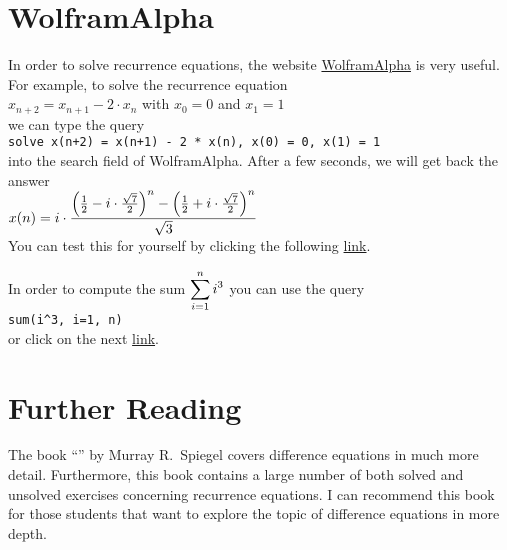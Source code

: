 \section{WolframAlpha}
In order to solve recurrence equations, the website \href{https://www.wolframalpha.com/}{WolframAlpha}
 is very useful.  For example, to solve the recurrence equation
\\[0.2cm]
\hspace*{1.3cm}
$x_{n+2} = x_{n+1} - 2 \cdot x_n$ \quad with $x_0 = 0$ and $x_1 = 1$ 
\\[0.2cm]
we can type the query
\\[0.2cm]
\hspace*{1.3cm}
\texttt{solve x(n+2) = x(n+1) - 2 * x(n), x(0) = 0, x(1) = 1}
\\[0.2cm]
into the search field of WolframAlpha.  After a few seconds, we will get back the answer
\\[0.2cm]
\hspace*{1.3cm}
$\displaystyle x(n) = i \cdot \frac{\left(\frac{1}{2} - i \cdot\frac{\sqrt{7}}{2}\right)^n -
                          \left(\frac{1}{2} + i \cdot\frac{\sqrt{7}}{2}\right)^n}{\sqrt{3}}$
\\[0.2cm]
You can test this for yourself by clicking the following                        
\href{https://www.wolframalpha.com/input?i=solve+x%28n%2B2%29+%3D+x%28n%2B1%29+-+2+*+x%28n%29%2C+x%280%29+%3D+0%2C+x%281%29+%3D+1}{link}.

In order to compute the sum $\displaystyle\sum\limits_{i=1}^n i^3$ you can use the query
\\[0.2cm]
\hspace*{1.3cm}
\texttt{sum(i\^{ }3, i=1, n)}
\\[0.2cm]
or click on the next \href{https://www.wolframalpha.com/input?i=sum%28i%5E3%2C+i%3D1%2C+n%29}{link}.




\section{Further Reading}
The book ``'' by Murray R.~Spiegel
\cite{spiegel:1971} covers difference equations in much more detail.  Furthermore, this book contains a large
number of both solved and unsolved exercises concerning recurrence equations. 
I can recommend this book for those students that want to explore the topic of difference equations in more depth.


